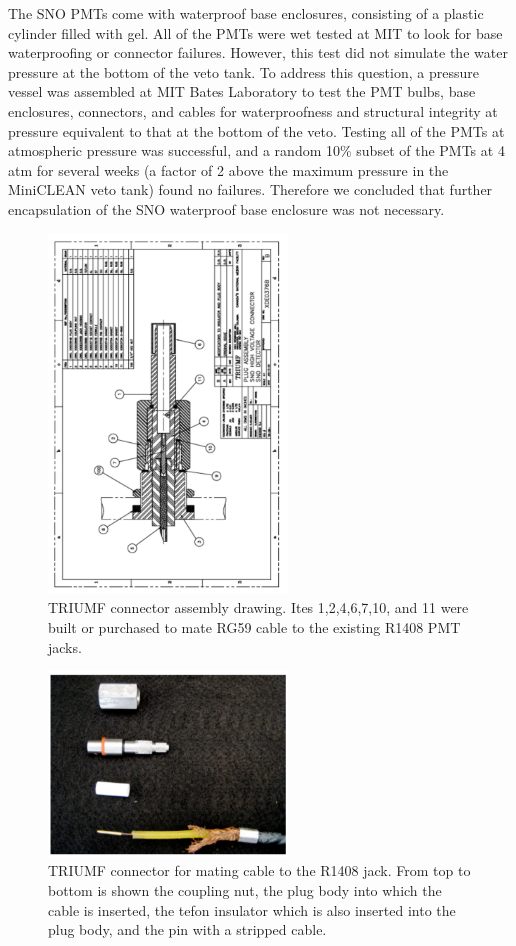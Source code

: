 \documentclass{JINST}
\begin{document}
The SNO PMTs come with waterproof base enclosures, consisting of a
plastic cylinder filled with gel.  All of the PMTs were wet tested at
MIT to look for base waterproofing or connector failures.  However,
this test did not simulate the water pressure at the bottom of the
veto tank.  To address this question, a pressure vessel was assembled
at MIT Bates Laboratory to test the PMT bulbs, base enclosures, connectors, and
cables for waterproofness and structural integrity at pressure
equivalent to that at the bottom of the veto. Testing
all of the PMTs at atmospheric pressure was successful, and a random
10\% subset of the PMTs at 4 atm for several weeks (a factor of 2
above the maximum pressure in the MiniCLEAN veto tank) found no
failures.  Therefore we concluded that further encapsulation of the
SNO waterproof base enclosure was not necessary.

\begin{figure}[ht]
\begin{center}
\includegraphics[width=2.5in,angle=270]{graphics/connectordrawing.pdf}
\caption{TRIUMF connector assembly drawing.  Ites 1,2,4,6,7,10, and 11 were built or purchased to mate RG59 cable to the existing R1408 PMT jacks.
\label{fig:connectordrawing}}
\end{center}
\end{figure}

\begin{figure}[ht]
\begin{center}
\includegraphics[width=2.5in]{graphics/connectorpic.pdf}
\caption{TRIUMF connector for mating cable to the R1408 jack.  From top to bottom is shown the coupling nut, the plug body into which the cable is inserted, the tefon insulator which is also inserted into the plug body, and the pin with a stripped cable.
\label{fig:connectorpic}}
\end{center}
\end{figure}
\end{document}

